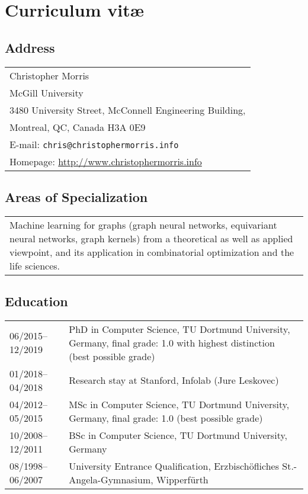 \documentclass[11pt, a4paper, DIV=12]{scrartcl}
\begin{document}
\section*{\textcolor{upmaroon}{Curriculum vitæ}}
\vspace{-20pt}
\hrulefill
\subsection*{Address}
\noindent
\begin{tabular}{l}
Christopher Morris\\
McGill University\\ 
3480 University Street, McConnell Engineering Building,\\ 
Montreal, QC, Canada H3A 0E9\\
E-mail: \texttt{chris@christophermorris.info} \\
Homepage: \url{http://www.christophermorris.info}\\
\end{tabular}

\subsection*{Areas of Specialization}
\noindent
\begin{tabular}{p{15.0cm}}
Machine learning for graphs (graph neural networks, equivariant neural networks, graph kernels) from a theoretical as well as applied viewpoint, and its application in combinatorial optimization and the life sciences. 
\end{tabular}

\subsection*{Education}
\noindent
\begin{tabular}{p{3.0cm}p{11.5cm}}
	06/2015--12/2019&PhD in Computer Science, TU Dortmund University, Germany, final grade: 1.0 with highest distinction  (best possible grade)\\
	01/2018--04/2018& Research stay at Stanford, Infolab (Jure Leskovec)\\
	04/2012--05/2015&MSc in Computer Science, TU Dortmund University, Germany, final grade: 1.0 (best possible grade)\\
	10/2008--12/2011&BSc in Computer Science, TU Dortmund University, Germany\\
	08/1998--06/2007&University Entrance Qualification, Erzbisch\"ofliches St.-Angela-Gymnasium, Wipperf\"urth\\
\end{tabular}
\end{document}
